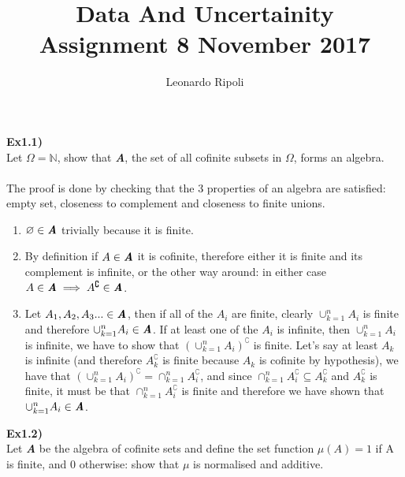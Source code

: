 \documentclass[12pt,mythesisstyle]{report}
\title{Data And Uncertainity\\Assignment 8 November 2017}
\author{Leonardo Ripoli}
\date{}
\begin{document}
\begin{titlepage}
\maketitle
\end{titlepage}
\textbf{Ex1.1)}\\
Let \(\Omega=\mathbb{N}\), show that \textbf{\textit{A}}, the set of all cofinite subsets in \(\Omega\), forms an algebra.
\\
\\The proof is done by checking that the 3 properties of an algebra are satisfied: empty set, closeness to complement and closeness to finite unions.
\\
\begin{enumerate}
\item \(\varnothing\in\textbf{\textit{A}}\) trivially because it is finite.\\
\item By definition if \(A\in\textbf{\textit{A}}\) it is cofinite, therefore either it is finite and its complement is infinite, or the other way around: in either case \(A\in\textbf{\textit{A}}\implies A^\complement\in\textbf{\textit{A}}\).\\
\item Let \(A_1, A_2, A_3...\in\textbf{\textit{A}}\), then if all of the \(A_i\) are finite, clearly \(\cup_{k=1}^nA_i\) is finite and therefore \(\cup_{k=1}^nA_i\in\textbf{\textit{A}}\). If at least one of the \(A_i\) is infinite, then \(\cup_{k=1}^nA_i\) is infinite, we have to show that \((\cup_{k=1}^nA_i)^\complement\) is finite. Let's say at least \(A_k\) is infinite (and therefore \(A_k^\complement\) is finite because \(A_k\) is cofinite by hypothesis), we have that \((\cup_{k=1}^nA_i)^\complement=\cap_{k=1}^nA_i^\complement\), and since \(\cap_{k=1}^nA_i^\complement\subseteq A_k^\complement\) and \(A_k^\complement\) is finite, it must be that \(\cap_{k=1}^nA_i^\complement\) is finite and therefore we have shown that \(\cup_{k=1}^nA_i\in\textbf{\textit{A}}\).
\end{enumerate}
\textbf{Ex1.2)}\\
Let \textbf{\textit{A}} be the algebra of cofinite sets and define the set function \(\mu(A)=1\) if A is finite, and 0 otherwise: show that \(\mu\) is normalised and additive.
\end{document}
